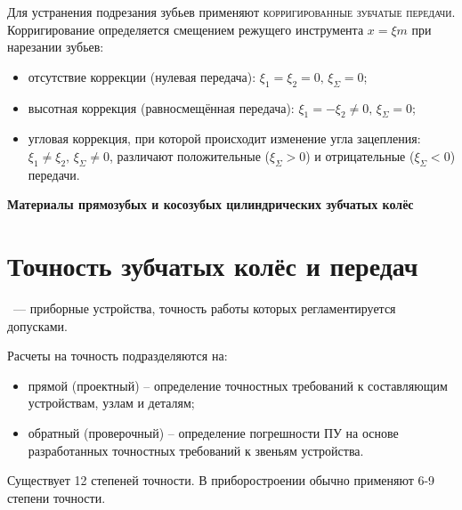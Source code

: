 \documentclass{tufte-book}
\begin{document}
Для устранения подрезания зубьев применяют \textsc{корригированные зубчатые передачи}.
Корригирование определяется смещением режущего инструмента $ x = \xi m $ при нарезании зубьев:
\begin{itemize}
	\item отсутствие коррекции (нулевая передача): $ \xi_1 = \xi_2 = 0, \, \xi_\Sigma=0 $;
	\item высотная коррекция (равносмещённая передача): $ \xi_1 = -\xi_2 \neq 0, \, \xi_\Sigma=0 $;
	\item угловая коррекция, при которой происходит изменение угла зацепления: $ \xi_1 \neq \xi_2, \, \xi_\Sigma \neq 0 $, различают положительные ($\xi_\Sigma > 0 $) и отрицательные ($\xi_\Sigma < 0 $) передачи.
\end{itemize}

\begin{flushleft}
	\textbf{Материалы прямозубых и косозубых цилиндрических зубчатых колёс}
\end{flushleft}


\section{Точность зубчатых колёс и передач}

~--- приборные устройства, точность работы которых регламентируется допусками.

Расчеты на точность подразделяются на:
\begin{itemize}
	\item прямой (проектный) -- определение точностных требований к составляющим устройствам, узлам и деталям;
	\item обратный (проверочный) -- определение погрешности ПУ на основе разработанных точностных требований к звеньям устройства.
\end{itemize}

Существует 12 степеней точности. В приборостроении обычно применяют 6-9 степени точности.
\end{document}
